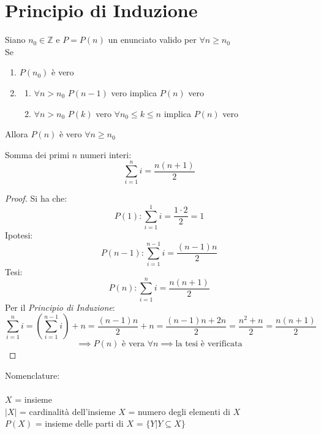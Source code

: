 \documentclass[a4paper,12pt, oneside]{book}
\begin{document}
\section{Principio di Induzione}
\begin{principio}
	Siano $n_0 \in \mathbb{Z}$ e $P=P(n)$ un enunciato valido per $\forall n \geq n_0$\\
	Se \begin{enumerate}
		\item $P(n_0)$ è vero
		\item \begin{enumerate}[label=\Roman*) ]
			      \item $\forall n > n_0$ $P(n-1)$ vero implica $P(n)$ vero
			      \item $\forall n > n_0$ $P(k)$ vero $\forall n_0 \leq k \leq n$ implica $P(n)$ vero
		      \end{enumerate}
	\end{enumerate}
	Allora $P(n)$ è vero $\forall n \geq n_0$
\end{principio}
\begin{shaded}
	\begin{esempio}
		Somma dei primi $n$ numeri interi:
		\begin{equation}
			\sum_{i=1}^{n} i=\frac{n(n+1)}{2}
		\end{equation}
		\begin{proof}
			Si ha che:
			$$P(1): \sum_{i=1}^{1} i = \frac{1 \cdot 2}{2} = 1$$
			Ipotesi:
			$$P(n-1): \sum_{i=1}^{n-1} i = \frac{(n-1)n}{2}$$
			Tesi:
			$$P(n): \sum_{i=1}^{n} i = \frac{n(n+1)}{2}$$
			Per il \textit{Principio di Induzione}:
			$$ \sum_{i=1}^{n} i = (\sum_{i=1}^{n-1} i) + n = \frac{(n-1)n}{2} + n = \frac{(n-1)n + 2n}{2} = \frac{n^2 + n}{2} = \frac{n(n+1)}{2}$$
			$$ \implies P(n) \mbox{ è vera } \forall n \implies \mbox{la tesi è verificata}$$
		\end{proof}
	\end{esempio}
\end{shaded}
\begin{shaded}
	\begin{nota}
		Nomenclature: \\\\
		$X$ = insieme \\
		$|X|$ = cardinalità dell'insieme $X$ = numero degli elementi di $X$ \\
		$P(X)$ = insieme delle parti di $X$ = $\{ Y | Y \subseteq X \}$
	\end{nota}
\end{shaded}
\end{document}
